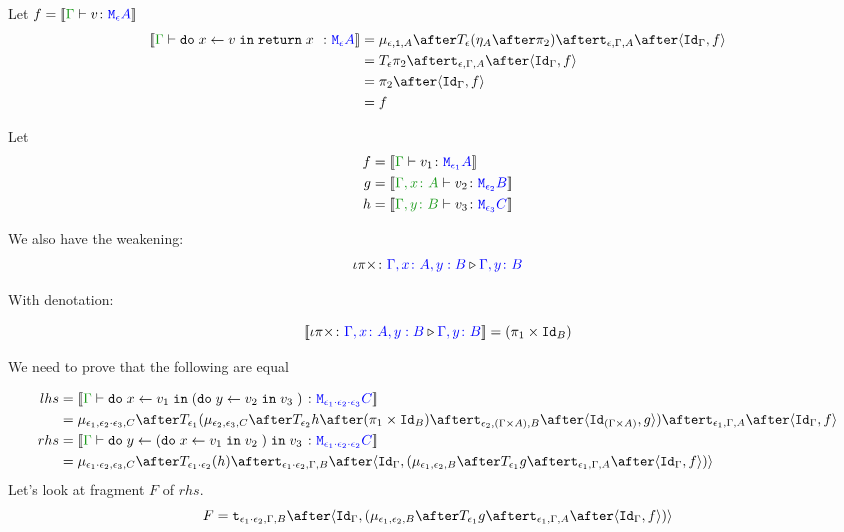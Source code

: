 \documentclass{report}
\begin{document}

Let $f = \deno{\gtyperelation{v}{\mea}}$ 
    \begin{equation}
    \begin{split}
        \deno{\gtyperelation{\doin{x}{v}{\return{x}}}{\mea}}  & = \bind{\e}{\1}{A} \after \T{\e}{(\point{A} \after \pp)} \after \tstrength{\e}{\G}{A}\after \pr{\idg}{f} \\
        & = \T{\e}{\pp} \after \tstrength{\e}{\G}{A} \after \pr {\idg}{f} \\
        & = \pp \after \pr{\idg}{f}\\
        & = f
    \end{split}
\end{equation}



Let
\begin{align}
    f ={}& \deno{\gtyperelation{v_1}{\M{\e_1}{A}}}\\
    g ={}& \deno{\typerelation{\gax}{v_2}{\M{\e_2}{B}}}\\
    h ={}& \deno{\typerelation{\gby}{v_3}{\M{\e_3}{C}}}
\end{align}

We also have the weakening:
\begin{equation}
    \iota\pi\times \colon {\color{blue}\Gamma, x\colon A, y: B} \triangleright {\color {blue} \Gamma, y\colon B}
\end{equation}

With denotation:

\begin{equation}
    {\bf [\![}\iota\pi\times \colon {\color{blue}\Gamma, x\colon A, y: B} \triangleright {\color {blue} \Gamma, y\colon B}{\bf ]\!]} = (\pi_1 \times \texttt{Id}_{B})
\end{equation}

We need to prove that the following are equal

\begin{align}
    lhs & =  \deno{\gtyperelation{\doin{x}{v_1}{(\doin{y}{v_2}{v_3})}}{\M{\e_1\dot\e_2\dot\e_3}{C}}} \\
    & = \bind{\e_1}{\e_2\dot\e_3}{C}\after\T{
        \e_1}{(\bind{\e_2}{\e_3}{C}\after\T{\e_2}{h\after(\p \times \Id{B})}\after\tstrength{\e_2}{(\G\times A)}{B}\after\pr{\Id{(\G\times A)}}{g}
        )}\after\tstrength{\e_1}{\G}{A}\after\pr{\idg}{f}\\
        rhs &  = \deno{\gtyperelation{\doin{y}{(\doin{x}{v_1}{v_2})}{v_3}}{\M{\e_1\dot\e_2\dot\e_2}{C}}}  \\
    & = \bind{\e_1\dot\e_2}{\e_3}{C}\after\T{\e_1\dot\e_2}{(h)}\after\tstrength{\e_1\dot\e_2}{\G}{B}\after\pr{\idg}{(\bind{\e_1}{\e_2}{B}\after\T{\e_1}{g}\after\tstrength{\e_1}{\G}{A}\after\pr{\idg}{f})} \\
\end{align}
Let's look at fragment $F$ of $rhs$.
\begin{equation}
    F = \tstrength{\e_1\dot\e_2}{\G}{B}\after\pr{\idg}{(\bind{\e_1}{\e_2}{B}\after\T{\e_1}{g}\after\tstrength{\e_1}{\G}{A}\after\pr{\idg}{f})}
\end{equation}
\end{document}
